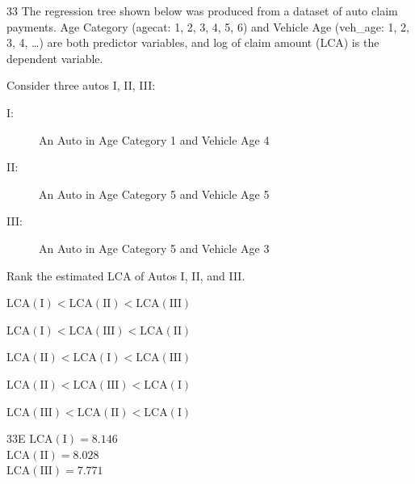 \begin{question}{33}
The regression tree shown below was produced from a dataset of auto claim payments. Age Category (agecat: 1, 2, 3, 4, 5, 6) and Vehicle Age (veh\_age: 1, 2, 3, 4, \ldots) are both predictor variables, and log of claim amount (LCA) is the dependent variable.


Consider three autos I, II, III:

\begin{description}
\item[I:] An Auto in Age Category 1 and Vehicle Age 4
\item[II:] An Auto in Age Category 5 and Vehicle Age 5
\item[III:] An Auto in Age Category 5 and Vehicle Age 3
\end{description}

Rank the estimated LCA of Autos I, II, and III.

\begin{choices}
\item $\mathrm{LCA(I)} < \mathrm{LCA(II)} < \mathrm{LCA(III)}$
\item $\mathrm{LCA(I)} < \mathrm{LCA(III)} < \mathrm{LCA(II)}$
\item $\mathrm{LCA(II)} < \mathrm{LCA(I)} < \mathrm{LCA(III)}$
\item $\mathrm{LCA(II)} < \mathrm{LCA(III)} < \mathrm{LCA(I)}$
\item $\mathrm{LCA(III)} < \mathrm{LCA(II)} < \mathrm{LCA(I)}$
\end{choices}
\end{question}
\begin{solution}{33}{E}
$\mathrm{LCA(I)} = 8.146$ \\
$\mathrm{LCA(II)} = 8.028$ \\
$\mathrm{LCA(III)} = 7.771$
\end{solution}

